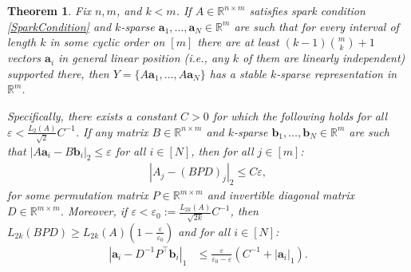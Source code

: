 \documentclass[journal, twocolumn]{IEEEtran}
\newtheorem{theorem}{Theorem}
\begin{document}
\begin{theorem}\label{DeterministicUniquenessTheorem}
Fix $n, m$, and $k < m$. If $A \in \mathbb{R}^{n \times m}$ satisfies spark condition \eqref{SparkCondition} and $k$-sparse \mbox{$\mathbf{a}_1, \ldots, \mathbf{a}_N \in \mathbb{R}^m$} are such that for every interval of length $k$ in some cyclic order on $[m]$ there are at least \mbox{$(k-1){m \choose k}+1$} vectors $\mathbf{a}_i$ in general linear position (i.e., any $k$ of them are linearly independent) supported there, then $Y = \{A\mathbf{a}_1, \ldots, A\mathbf{a}_N\}$ has a stable $k$-sparse representation in $\mathbb{R}^m$.

Specifically, there exists a constant $C > 0$ for which the following holds for all $\varepsilon < \frac{L_2(A)}{\sqrt{2}}C^{-1}$. If any matrix $B \in \mathbb{R}^{n \times m}$ and $k$-sparse $\mathbf{b}_1, \ldots, \mathbf{b}_N \in \mathbb{R}^m$ are such that \mbox{$|A\mathbf{a}_i - B\mathbf{b}_i|_2 \leq \varepsilon$} for all $i \in [N]$, then for all $j \in [m]$:
\begin{align}\label{Cstable}
|A_j-(BPD)_j|_2 \leq C\varepsilon,
\end{align}
%
for some permutation matrix $P \in \mathbb{R}^{m \times m}$ and invertible diagonal matrix $D \in \mathbb{R}^{m \times m}$.  Moreover, if $\varepsilon < \varepsilon_0 := \frac{L_{2k}(A)}{\sqrt{2k}}C^{-1}$, then $L_{2k}(BPD) \geq L_{2k}(A)\left( 1 - \frac{\varepsilon}{\varepsilon_0} \right)$ and for all $i \in [N]$:
\begin{align}\label{b-PDa}
|\mathbf{a}_i - D^{-1}P^{\top}\mathbf{b}_i|_1 &\leq \frac{\varepsilon }{ \varepsilon_0 - \varepsilon} \left( C^{-1}+|\mathbf{a}_i|_1 \right).
\end{align}
\end{theorem}


\end{document}
